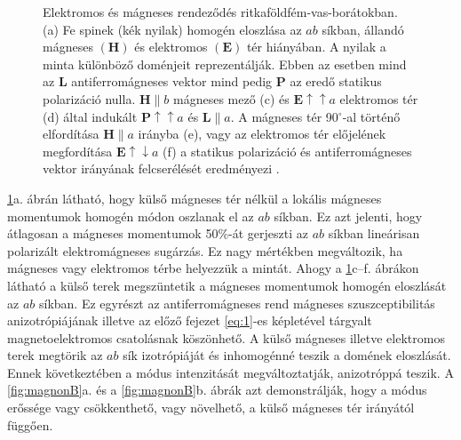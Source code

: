\documentclass[a4paper,12pt]{article}
\numberwithin{equation}{section}
\begin{document}
\begin{figure}[H]
\begin{center}
\begin{subfigure}[b]{0.6\linewidth}
\end{subfigure}

\end{center}
\caption{Elektromos és mágneses rendeződés ritkaföldfém-vas-borátokban.\\ (a) Fe spinek (kék nyilak) homogén eloszlása az $a b$ síkban, állandó mágneses $(\mathbf{H})$ és elektromos $(\mathbf{E})$ tér hiányában. A nyilak a minta különböző doménjeit reprezentálják. Ebben az esetben mind az $\mathbf{L}$ antiferromágneses vektor mind pedig $\mathbf{P}$ az eredő statikus polarizáció nulla. $\mathbf{H} \parallel b$ mágneses mező (c) és  $\mathbf{E} \uparrow \uparrow a$ elektromos tér (d) által indukált $\mathbf{P} \uparrow \uparrow a$ és $\mathbf{L} \parallel a$. A mágneses tér 90$^\circ$-al történő elfordítása $\mathbf{H} \parallel a$ irányba (e), vagy az elektromos tér előjelének megfordítása $\mathbf{E} \uparrow \downarrow a$ (f) a statikus polarizáció és antiferromágneses vektor irányának felcserélését eredményezi \cite{2018_PRL}.}
\label{fig:spinszerk}
\end{figure}

\ref{fig:spinszerk}a. ábrán látható, hogy külső mágneses tér nélkül a lokális mágneses momentumok homogén módon oszlanak el az $ab$ síkban. Ez azt jelenti, hogy átlagosan a mágneses momentumok 50\%-át gerjeszti az $ab$ síkban lineárisan polarizált elektromágneses sugárzás. Ez nagy mértékben megváltozik, ha mágneses vagy elektromos térbe helyezzük a mintát. Ahogy a \ref{fig:spinszerk}c--f. ábrákon látható a külső terek megszüntetik a mágneses momentumok homogén eloszlását az $ab$ síkban. Ez egyrészt az antiferromágneses rend mágneses szuszceptibilitás anizotrópiájának illetve az előző fejezet \eqref{eq:1}-es képletével tárgyalt magnetoelektromos csatolásnak köszönhető. A külső mágneses illetve elektromos terek megtörik az $ab$ sík izotrópiáját és inhomogénné teszik a domének eloszlását. Ennek következtében  a módus intenzitását megváltoztatják, anizotróppá teszik. A \ref{fig:magnonB}a. és a \ref{fig:magnonB}b. ábrák azt demonstrálják, hogy a módus erőssége vagy csökkenthető, vagy növelhető, a külső mágneses tér irányától függően.
\end{document}
